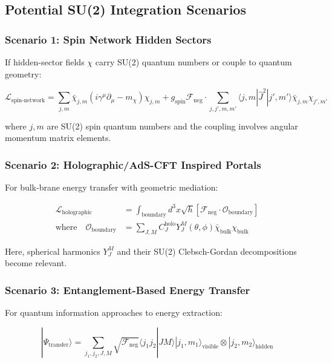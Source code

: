 \documentclass[12pt]{article}
\begin{document}
\subsection{Potential SU(2) Integration Scenarios}

\subsubsection{Scenario 1: Spin Network Hidden Sectors}

If hidden-sector fields $\chi$ carry SU(2) quantum numbers or couple to quantum geometry:

\begin{equation}
\mathcal{L}_{\text{spin-network}} = \sum_{j,m} \bar{\chi}_{j,m} \left( i\gamma^{\mu}\partial_{\mu} - m_{\chi} \right) \chi_{j,m} + g_{\text{spin}} \mathcal{F}_{\text{neg}} \cdot \sum_{j,j',m,m'} \langle j,m | \hat{J}^2 | j',m' \rangle \bar{\chi}_{j,m} \chi_{j',m'}
\end{equation}

where $j,m$ are SU(2) spin quantum numbers and the coupling involves angular momentum matrix elements.

\subsubsection{Scenario 2: Holographic/AdS-CFT Inspired Portals}

For bulk-brane energy transfer with geometric mediation:

\begin{align}
\mathcal{L}_{\text{holographic}} &= \int_{\text{boundary}} d^3x \sqrt{h} \left[ \mathcal{F}_{\text{neg}} \cdot \mathcal{O}_{\text{boundary}} \right] \\
\text{where} \quad \mathcal{O}_{\text{boundary}} &= \sum_{J,M} C_J^{\text{holo}} Y_J^M(\theta,\phi) \bar{\chi}_{\text{bulk}} \chi_{\text{bulk}}
\end{align}

Here, spherical harmonics $Y_J^M$ and their SU(2) Clebsch-Gordan decompositions become relevant.

\subsubsection{Scenario 3: Entanglement-Based Energy Transfer}

For quantum information approaches to energy extraction:

\begin{equation}
|\Psi_{\text{transfer}}\rangle = \sum_{j_1,j_2,J,M} \sqrt{\mathcal{F}_{\text{neg}}} \langle j_1 j_2 | J M \rangle |j_1,m_1\rangle_{\text{visible}} \otimes |j_2,m_2\rangle_{\text{hidden}}
\end{equation}
\end{document}
